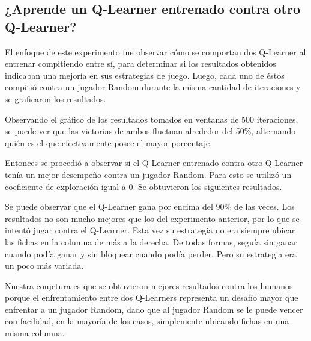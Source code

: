 \subsection{¿Aprende un Q-Learner entrenado contra otro Q-Learner?}

El enfoque de este experimento fue observar cómo se comportan dos Q-Learner al entrenar compitiendo entre sí, para determinar si los resultados obtenidos indicaban una mejoría en sus estrategias de juego.
Luego, cada uno de éstos compitió contra un jugador Random durante la misma cantidad de iteraciones y se graficaron los resultados.



Observando el gráfico de los resultados tomados en ventanas de 500 iteraciones, se puede ver que las victorias de ambos fluctuan alrededor del 50\%, alternando quién es el que efectivamente posee el mayor porcentaje.

Entonces se procedió a observar si el Q-Learner entrenado contra otro Q-Learner tenía un mejor desempeño contra un jugador Random. Para esto se utilizó un coeficiente de exploración igual a 0. Se obtuvieron los siguientes resultados.



Se puede observar que el Q-Learner gana por encima del 90\% de las veces. Los resultados no son mucho mejores que los del experimento anterior, por lo que se intentó jugar contra el Q-Learner. Esta vez su estrategia no era siempre ubicar las fichas en la columna de más a la derecha. De todas formas, seguía sin ganar cuando podía ganar y sin bloquear cuando podía perder. Pero su estrategia era un poco más variada.

Nuestra conjetura es que se obtuvieron mejores resultados contra los humanos porque el enfrentamiento entre dos Q-Learners representa un desafío mayor que enfrentar a un jugador Random, dado que al jugador Random se le puede vencer con facilidad, en la mayoría de los casos, simplemente ubicando fichas en una misma columna.
